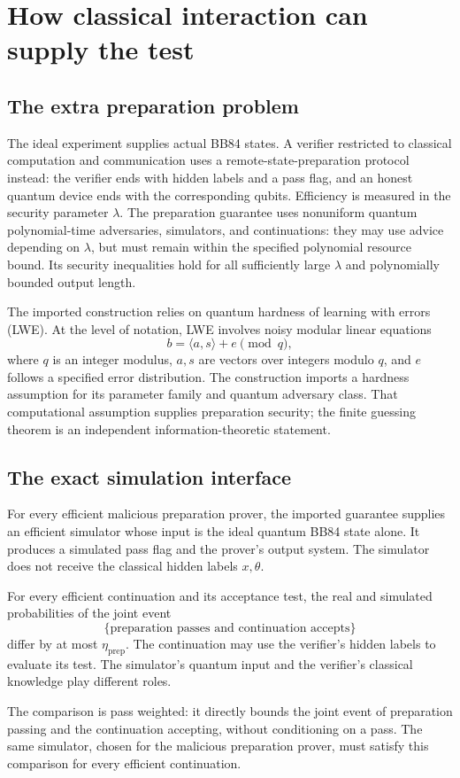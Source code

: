 \documentclass[11pt,a4paper]{article}
\newcommand{\newsection}[1]{\section{#1}}
\begin{document}
\newsection{How classical interaction can supply the test}
\subsection{The extra preparation problem}
The ideal experiment supplies actual BB84 states. A verifier restricted to classical computation and communication uses a remote-state-preparation protocol instead: the verifier ends with hidden labels and a pass flag, and an honest quantum device ends with the corresponding qubits. Efficiency is measured in the security parameter $\lambda$. The preparation guarantee uses nonuniform quantum polynomial-time adversaries, simulators, and continuations: they may use advice depending on $\lambda$, but must remain within the specified polynomial resource bound. Its security inequalities hold for all sufficiently large $\lambda$ and polynomially bounded output length.

The imported construction relies on quantum hardness of learning with errors (LWE). At the level of notation, LWE involves noisy modular linear equations
\[
b=\langle a,s\rangle+e\pmod q,
\]
where $q$ is an integer modulus, $a,s$ are vectors over integers modulo $q$, and $e$ follows a specified error distribution. The construction imports a hardness assumption for its parameter family and quantum adversary class. That computational assumption supplies preparation security; the finite guessing theorem is an independent information-theoretic statement.

\subsection{The exact simulation interface}
For every efficient malicious preparation prover, the imported guarantee supplies an efficient simulator whose input is the ideal quantum BB84 state alone. It produces a simulated pass flag and the prover's output system. The simulator does not receive the classical hidden labels $x,\theta$.

For every efficient continuation and its acceptance test, the real and simulated probabilities of the joint event
\[
\{\text{preparation passes and continuation accepts}\}
\]
differ by at most $\eta_{\mathrm{prep}}$. The continuation may use the verifier's hidden labels to evaluate its test. The simulator's quantum input and the verifier's classical knowledge play different roles.

\begin{keybox}
The comparison is pass weighted: it directly bounds the joint event of preparation passing and the continuation accepting, without conditioning on a pass. The same simulator, chosen for the malicious preparation prover, must satisfy this comparison for every efficient continuation.
\end{keybox}
\end{document}
